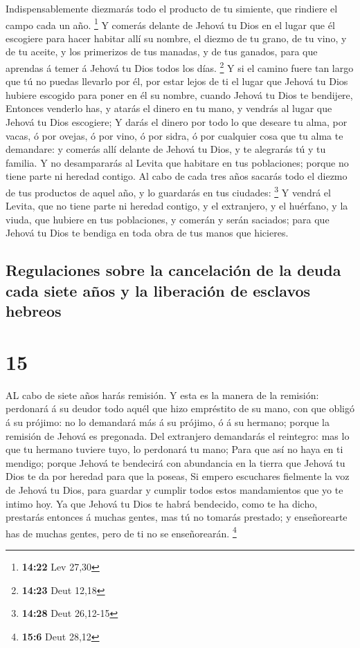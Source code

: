  Indispensablemente diezmarás todo el producto de tu
simiente, que rindiere el campo cada un año. \footnote{\textbf{14:22}
  Lev 27,30}  Y comerás delante de Jehová tu Dios en el
lugar que él escogiere para hacer habitar allí su nombre, el diezmo de
tu grano, de tu vino, y de tu aceite, y los primerizos de tus manadas, y
de tus ganados, para que aprendas á temer á Jehová tu Dios todos los
días. \footnote{\textbf{14:23} Deut 12,18}  Y si el camino
fuere tan largo que tú no puedas llevarlo por él, por estar lejos de ti
el lugar que Jehová tu Dios hubiere escogido para poner en él su nombre,
cuando Jehová tu Dios te bendijere,  Entonces venderlo has,
y atarás el dinero en tu mano, y vendrás al lugar que Jehová tu Dios
escogiere;  Y darás el dinero por todo lo que deseare tu
alma, por vacas, ó por ovejas, ó por vino, ó por sidra, ó por cualquier
cosa que tu alma te demandare: y comerás allí delante de Jehová tu Dios,
y te alegrarás tú y tu familia.  Y no desampararás al
Levita que habitare en tus poblaciones; porque no tiene parte ni heredad
contigo.  Al cabo de cada tres años sacarás todo el diezmo
de tus productos de aquel año, y lo guardarás en tus ciudades:
\footnote{\textbf{14:28} Deut 26,12-15}  Y vendrá el
Levita, que no tiene parte ni heredad contigo, y el extranjero, y el
huérfano, y la viuda, que hubiere en tus poblaciones, y comerán y serán
saciados; para que Jehová tu Dios te bendiga en toda obra de tus manos
que hicieres.

\hypertarget{regulaciones-sobre-la-cancelaciuxf3n-de-la-deuda-cada-siete-auxf1os-y-la-liberaciuxf3n-de-esclavos-hebreos}{%
\subsection{Regulaciones sobre la cancelación de la deuda cada siete
años y la liberación de esclavos
hebreos}\label{regulaciones-sobre-la-cancelaciuxf3n-de-la-deuda-cada-siete-auxf1os-y-la-liberaciuxf3n-de-esclavos-hebreos}}

\hypertarget{section-14}{%
\section{15}\label{section-14}}

 AL cabo de siete años harás remisión.  Y esta
es la manera de la remisión: perdonará á su deudor todo aquél que hizo
empréstito de su mano, con que obligó á su prójimo: no lo demandará más
á su prójimo, ó á su hermano; porque la remisión de Jehová es pregonada.
 Del extranjero demandarás el reintegro: mas lo que tu
hermano tuviere tuyo, lo perdonará tu mano;  Para que así no
haya en ti mendigo; porque Jehová te bendecirá con abundancia en la
tierra que Jehová tu Dios te da por heredad para que la poseas,
 Si empero escuchares fielmente la voz de Jehová tu Dios,
para guardar y cumplir todos estos mandamientos que yo te intimo hoy.
 Ya que Jehová tu Dios te habrá bendecido, como te ha dicho,
prestarás entonces á muchas gentes, mas tú no tomarás prestado; y
enseñorearte has de muchas gentes, pero de ti no se enseñorearán.
\footnote{\textbf{15:6} Deut 28,12}

